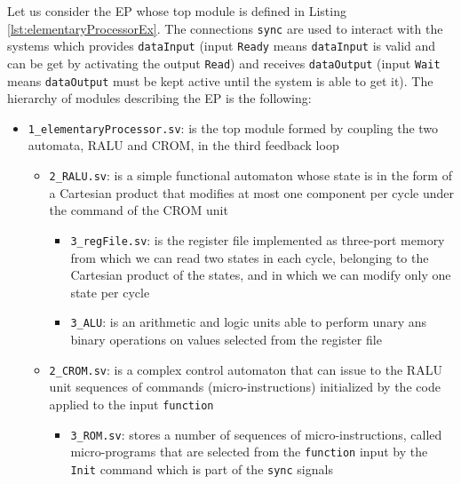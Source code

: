 \begin{exemplu}\label{eProc}
Let us consider the EP whose top module is defined in Listing \ref{lst:elementaryProcessorEx}. The connections {\tt sync} are used to interact with the systems which provides {\tt dataInput} (input {\tt Ready} means {\tt dataInput} is valid and can be get by activating the output {\tt Read}) and receives {\tt dataOutput} (input {\tt Wait} means {\tt dataOutput} must be kept active until the system is able to get it). The hierarchy of modules describing the EP is the following:
\begin{itemize}
    \item {\tt 1\_elementaryProcessor.sv}:  is the top module formed by coupling the two automata, RALU  and CROM, in the third feedback loop 
    \begin{itemize}
        \item {\tt 2\_RALU.sv}:  is a simple functional automaton whose state is in the form of a Cartesian product that modifies at most one component per cycle under the command of the CROM unit
            \begin{itemize}
                \item {\tt 3\_regFile.sv}:  is the register file implemented as three-port memory from which we can read two states in each cycle, belonging to the Cartesian product of the states, and in which we can modify only one state per cycle
                \item {\tt 3\_ALU}:  is an arithmetic and logic units able to perform unary ans binary operations on values selected from the register file
            \end{itemize}
        \item {\tt 2\_CROM.sv}:  is a complex control automaton that can issue to the RALU unit sequences of commands (micro-instructions) initialized by the code applied to the input {\tt function}
            \begin{itemize}
                \item {\tt 3\_ROM.sv}:  stores a number of sequences of micro-instructions, called micro-programs that are selected from the {\tt function} input by the {\tt Init} command which is part of the {\tt sync} signals
            \end{itemize}
    \end{itemize}
\end{itemize}


{\em 
{}
}


\end{exemplu}
